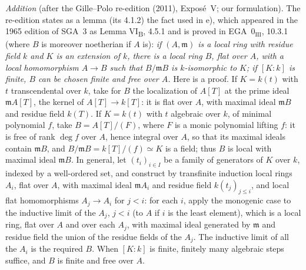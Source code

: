 \par\medskip\noindent
\emph{Addition} (after the Gille--Polo re-edition (2011), Exposé~V; our
formulation). The re-edition states as a lemma (its 4.1.2) the fact used
in e), which appeared in the 1965 edition of SGA~3 as Lemma
VI\textsubscript{B}, 4.5.1 and is proved in EGA~\(0_{\mathrm{III}}\), 10.3.1 (where \(B\) is
moreover noetherian if \(A\) is): \emph{if \((A,\mathfrak m)\) is a local ring
with residue field \(k\) and \(K\) is an extension of \(k\), there is a local
ring \(B\), flat over \(A\), with a local homomorphism \(A\to B\) such that
\(B/\mathfrak mB\) is \(k\)-isomorphic to \(K\); if \([K:k]\) is finite, \(B\) can be
chosen finite and free over \(A\).} Here is a proof. If \(K=k(t)\) with \(t\)
transcendental over \(k\), take for \(B\) the localization of \(A[T]\) at the
prime ideal \(\mathfrak mA[T]\), the kernel of \(A[T]\to k[T]\): it is flat over
\(A\), with maximal ideal \(\mathfrak mB\) and residue field \(k(T)\). If
\(K=k(t)\) with \(t\) algebraic over \(k\), of minimal polynomial \(f\), take
\(B=A[T]/(F)\), where \(F\) is a monic polynomial lifting \(f\): it is free of
rank \(\deg f\) over \(A\), hence integral over \(A\), so that its maximal
ideals contain \(\mathfrak mB\), and \(B/\mathfrak mB=k[T]/(f)\simeq K\) is a field;
thus \(B\) is local with maximal ideal \(\mathfrak mB\). In general, let
\((t_i)_{i\in I}\) be a family of generators of \(K\) over \(k\), indexed by a
well-ordered set, and construct by transfinite induction local rings
\(A_i\), flat over \(A\), with maximal ideal \(\mathfrak mA_i\) and residue field
\(k(t_j)_{j\leq i}\), and local flat homomorphisms \(A_j\to A_i\) for \(j<i\):
for each \(i\), apply the monogenic case to the inductive limit of the
\(A_j\), \(j<i\) (to \(A\) if \(i\) is the least element), which is a local ring,
flat over \(A\) and over each \(A_j\), with maximal ideal generated by
\(\mathfrak m\) and residue field the union of the residue fields of the
\(A_j\). The inductive limit of all the \(A_i\) is the required \(B\). When
\([K:k]\) is finite, finitely many algebraic steps suffice, and \(B\) is finite
and free over \(A\).
\par\medskip

